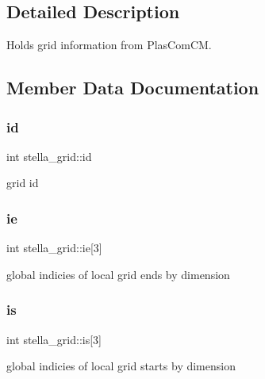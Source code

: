 \subsection{Detailed Description}
Holds grid information from Plas\+Com\+CM. 

\subsection{Member Data Documentation}
\mbox{\label{structstella__grid_ab61ffb667d6d32a3b629bab6e513ffb8}} 
\subsubsection{\texorpdfstring{id}{id}}
{\footnotesize\ttfamily int stella\+\_\+grid\+::id}



grid id 

\mbox{\label{structstella__grid_a53051f7c69d6443f1dda4c6e9bc9aba1}} 
\subsubsection{\texorpdfstring{ie}{ie}}
{\footnotesize\ttfamily int stella\+\_\+grid\+::ie\mbox{[}3\mbox{]}}



global indicies of local grid ends by dimension 

\mbox{\label{structstella__grid_a7604c64f87035bf528be4c95b25b16cc}} 
\subsubsection{\texorpdfstring{is}{is}}
{\footnotesize\ttfamily int stella\+\_\+grid\+::is\mbox{[}3\mbox{]}}



global indicies of local grid starts by dimension 

\mbox{\label{structstella__grid_a0ddfdd7b1459b3087fa1d967af299007}} 
